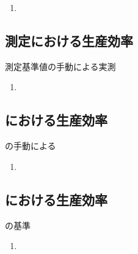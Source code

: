 \begin{Issues}{\TBW}
\begin{enumerate}[label=\sarrow]
\item[{\sarrow[red]}]
\end{enumerate}
\end{Issues}


\subsection{測定における生産効率}

\begin{Issues}{測定基準値の手動による実測\TBW}
\begin{enumerate}[label=\sarrow]
\item[{\sarrow[red]}]
\end{enumerate}
\end{Issues}


\subsection{\EndFacecutMilling における生産効率}

\begin{Issues}{\EndFacecutMilling の手動による\TDCorrection\TBW}
\begin{enumerate}[label=\sarrow]
\item[{\sarrow[red]}]
\end{enumerate}
\end{Issues}


\subsection{\KeywayMilling における生産効率}

\begin{Issues}{\AsideKeywayDepth の基準\TBW}
\begin{enumerate}[label=\sarrow]
\item[{\sarrow[red]}]
\end{enumerate}
\end{Issues}


